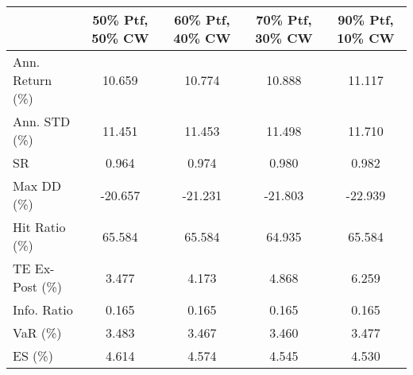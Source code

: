 \begin{tabular}{lcccc}
\toprule
{} &  50\% Ptf, 50\% CW &  60\% Ptf, 40\% CW &  70\% Ptf, 30\% CW &  90\% Ptf, 10\% CW \\
\midrule
Ann. Return (\%) &           10.659 &           10.774 &           10.888 &           11.117 \\
Ann. STD (\%)    &           11.451 &           11.453 &           11.498 &           11.710 \\
SR              &            0.964 &            0.974 &            0.980 &            0.982 \\
Max DD (\%)      &          -20.657 &          -21.231 &          -21.803 &          -22.939 \\
Hit Ratio (\%)   &           65.584 &           65.584 &           64.935 &           65.584 \\
TE Ex-Post (\%)  &            3.477 &            4.173 &            4.868 &            6.259 \\
Info. Ratio     &            0.165 &            0.165 &            0.165 &            0.165 \\
VaR (\%)         &            3.483 &            3.467 &            3.460 &            3.477 \\
ES (\%)          &            4.614 &            4.574 &            4.545 &            4.530 \\
\bottomrule
\end{tabular}
